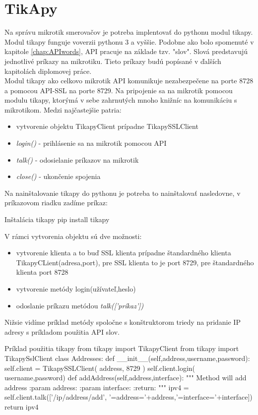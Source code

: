 \section{TikApy}
\label{sec:tikapy}
Na správu mikrotik smerovačov je potreba implentovať do pythonu modul tikapy\cite{tikapy}. Modul tikapy funguje voverzii pythonu 3 a vyššie. Podobne ako bolo spomenuté v kapitole \ref{chap:APIwords}, API pracuje na základe tzv. "slov". Slová predstavujú jednotlivé príkazy na mikrotiku. Tieto príkazy budú popísané v ďalších kapitolách diplomovej práce.\\
Modul tikapy ako celkovo mikrotik API komunikuje nezabezpečene na porte 8728 a pomocou API-SSL na porte 8729. Na pripojenie sa na mikrotik pomocou modulu tikapy, ktorýmá v sebe zahrnutých mnoho knižníc na komunikáciu s mikrotikom. Medzi najčastejšie patria:\begin{itemize}
\item vytvorenie objektu TikapyClient prípadne TikapySSLClient
\item \textit{login()} - prihlásenie sa na mikrotik pomocou API
\item \textit{talk()} - odosielanie príkazov na mikrotik
\item  \textit{close()} - ukončenie spojenia
\end{itemize} 
Na nainštalovanie tikapy do pythonu je potreba to nainštalovať nasledovne, v príkazovom riadku zadíme príkaz:
\begin{sexylisting}{Inštalácia tikapy}
pip install tikapy
\end{sexylisting}
V rámci vytvorenia objektu sú dve možnosti:\begin{itemize}
\item vytvorenie klienta a to buď SSL klienta prípadne štandardného klienta TikapyCLient(adresa,port), pre SSL klienta to je port 8729, pre štandardného klienta port 8728
\item vytvorenie metódy login(užívateľ,heslo)
\item odoslanie príkazu metódou \textit{talk(['príkaz'])} 
\end{itemize}
Nižsie vidíme príklad metódy spoločne s konštruktorom triedy na pridanie IP adresy s príkladom použitia API slov.
\begin{sexylisting}{Príklad použitia tikapy}
from tikapy import TikapyClient
from tikapy import TikapySslClient
class Addresses:
    def __init__(self,address,username,password):
        self.client = TikapySSLClient( address, 8729 )
        self.client.login( username,password)
    def addAddress(self,address,interface):
     """
     Method will add address
     :param address:
     :param interface:
     :return:
     """
     ipv4 = self.client.talk(['/ip/address/add',
     '=address='+address,'=interface='+interface])
     return ipv4
\end{sexylisting}




